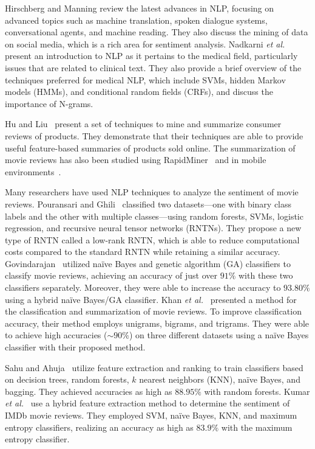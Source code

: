 \documentclass[conference]{IEEEtran}
\begin{document}
Hirschberg and Manning \cite{ref:Hirschberg} review the latest advances in NLP, focusing on advanced topics such as machine translation, spoken dialogue systems, conversational agents, and machine reading. They also discuss the mining of data on social media, which is a rich area for sentiment analysis. Nadkarni \emph{et al.}~\cite{ref:Nadkarni} present an introduction to NLP as it pertains to the medical field, particularly issues that are related to clinical text. They also provide a brief overview of the techniques preferred for medical NLP, which include SVMs, hidden Markov models (HMMs), and conditional random fields (CRFs), and discuss the importance of N-grams.

Hu and Liu~\cite{ref:Hu} present a set of techniques to mine and summarize consumer reviews of products. They demonstrate that their techniques are able to provide useful feature-based summaries of products sold online. The summarization of movie reviews has also been studied using RapidMiner~\cite{ref:Alsaqer} and in mobile environments~\cite{ref:CLiu}.

Many researchers have used NLP techniques to analyze the sentiment of movie reviews. Pouransari and Ghili~\cite{ref:Pouransari} classified two datasets---one with binary class labels and the other with multiple classes---using random forests, SVMs, logistic regression, and recursive neural tensor networks (RNTNs). They propose a new type of RNTN called a low-rank RNTN, which is able to reduce computational costs compared to the standard RNTN while retaining a similar accuracy. Govindarajan~\cite{ref:Govindarajan} utilized na\"{i}ve Bayes and genetic algorithm (GA) classifiers to classify movie reviews, achieving an accuracy of just over \(91\%\) with these two classifiers separately. Moreover, they were able to increase the accuracy to \(93.80\%\) using a hybrid na\"{i}ve Bayes/GA classifier. Khan \emph{et al.}~\cite{ref:Khan} presented a method for the classification and summarization of movie reviews. To improve classification accuracy, their method employs unigrams, bigrams, and trigrams. They were able to achieve high accuracies (\(\sim\)\(90\%\)) on three different datasets using a na\"{i}ve Bayes classifier with their proposed method.

Sahu and Ahuja~\cite{ref:Sahu} utilize feature extraction and ranking to train classifiers based on decision trees, random forests, \(k\) nearest neighbors (KNN), na\"{i}ve Bayes, and bagging. They achieved accuracies as high as \(88.95\%\) with random forests. Kumar \emph{et al.}~\cite{ref:Kumar} use a hybrid feature extraction method to determine the sentiment of IMDb movie reviews. They employed SVM, na\"{i}ve Bayes, KNN, and maximum entropy classifiers, realizing an accuracy as high as \(83.9\%\) with the maximum entropy classifier.
\end{document}
